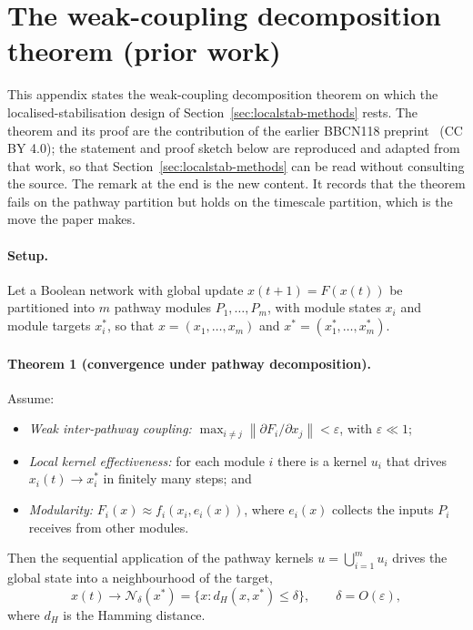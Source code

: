 \section{The weak-coupling decomposition theorem (prior work)}
\label{app:theorem}

This appendix states the weak-coupling decomposition theorem on which the localised-stabilisation
design of Section~\ref{sec:localstab-methods} rests. The theorem and its proof are the contribution
of the earlier BBCN118 preprint~\cite{bhatti2026} (CC BY 4.0); the statement and proof sketch below
are reproduced and adapted from that work, so that Section~\ref{sec:localstab-methods} can be read
without consulting the source. The remark at the end is the new content. It records that the theorem
fails on the pathway partition but holds on the timescale partition, which is the move the paper
makes.

\paragraph{Setup.} Let a Boolean network with global update $x(t{+}1)=F(x(t))$ be partitioned into
$m$ pathway modules $P_1,\dots,P_m$, with module states $x_i$ and module targets $x_i^{*}$, so that
$x=(x_1,\dots,x_m)$ and $x^{*}=(x_1^{*},\dots,x_m^{*})$.

\paragraph{Theorem 1 (convergence under pathway decomposition).} Assume:
\begin{itemize}
\item[(A1)] \emph{Weak inter-pathway coupling:} $\displaystyle\max_{i\neq j}\left\|\partial F_i/\partial x_j\right\| < \varepsilon$, with $\varepsilon \ll 1$;
\item[(A2)] \emph{Local kernel effectiveness:} for each module $i$ there is a kernel $u_i$ that drives $x_i(t)\to x_i^{*}$ in finitely many steps; and
\item[(A3)] \emph{Modularity:} $F_i(x)\approx f_i\!\left(x_i, e_i(x)\right)$, where $e_i(x)$ collects the inputs $P_i$ receives from other modules.
\end{itemize}
Then the sequential application of the pathway kernels $u=\bigcup_{i=1}^{m} u_i$ drives the global
state into a neighbourhood of the target,
\[
x(t)\to \mathcal{N}_\delta(x^{*})=\{x : d_H(x,x^{*})\le \delta\},\qquad \delta = O(\varepsilon),
\]
where $d_H$ is the Hamming distance.

